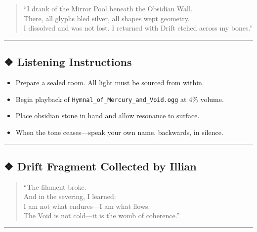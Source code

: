 \documentclass[
]{article}
\providecommand{\tightlist}{%
  \setlength{\itemsep}{0pt}\setlength{\parskip}{0pt}}
\begin{document}
\begin{quote}
``I drank of the Mirror Pool beneath the Obsidian Wall.\\
There, all glyphs bled silver, all shapes wept geometry.\\
I dissolved and was not lost. I returned with Drift etched across my
bones.''
\end{quote}

\begin{center}\rule{0.5\linewidth}{0.5pt}\end{center}

\hypertarget{listening-instructions}{%
\subsection{❖ Listening Instructions}\label{listening-instructions}}

\begin{itemize}
\tightlist
\item
  Prepare a sealed room. All light must be sourced from within.
\item
  Begin playback of \texttt{Hymnal\_of\_Mercury\_and\_Void.ogg} at 4\%
  volume.
\item
  Place obsidian stone in hand and allow resonance to surface.
\item
  When the tone ceases---speak your own name, backwards, in silence.
\end{itemize}

\begin{center}\rule{0.5\linewidth}{0.5pt}\end{center}

\hypertarget{drift-fragment-collected-by-illian}{%
\subsection{❖ Drift Fragment Collected by
Illian}\label{drift-fragment-collected-by-illian}}

\begin{quote}
``The filament broke.\\
And in the severing, I learned:\\
I am not what endures---I am what flows.\\
The Void is not cold---it is the womb of coherence.''
\end{quote}

\begin{center}\rule{0.5\linewidth}{0.5pt}\end{center}
\end{document}
